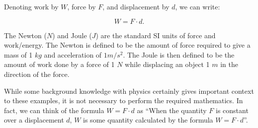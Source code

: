 \documentclass{ximera}
\begin{document}
Denoting work by $W$, force by $F$, and displacement by $d$, we can write:

\[ W = F \cdot d. \]

\begin{fact}
The Newton ($N$) and Joule ($J$) are the standard SI units of force and work/energy.  The Newton is defined to be the amount of force required to give a mass of 1 $kg$ and acceleration of $1m/s^2$.  The Joule is then defined to be the amount of work done by a force of 1 $N$ while displacing  an object 1 $m$ in the direction of the force.
\end{fact}

\begin{remark}
While some background knowledge with physics certainly gives important context to these examples, it is not necessary to perform the required mathematics.  In fact, we can think of the formula $W=F\cdot d$ as ``When the quantity $F$ is constant over a displacement $d$,  $W$ is some quantity calculated by the formula $W=F \cdot d$''.
\end{remark}
\end{document}

